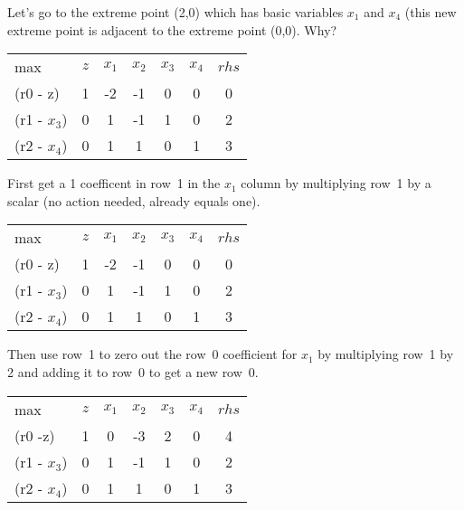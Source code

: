 Let's go to the extreme point (2,0) which has basic variables $x_1$ and $x_4$ (this new extreme point is adjacent to the extreme point (0,0). Why? \\
\begin{center} \begin{tabular} {l|c||c|c|c|c|c|}  \cline{2-7}
max & $z$	& $x_1$ & $x_2$  & $x_3$	& $x_4$	& $rhs$ \\ \cline{2-7}
(r0 - z)	    & 1		& -2        &  -1        &	 0 	    &	  0		&   0    \\ \cline{2-7}
(r1 - $x_3$)			& 0		&	 1        &     -1     &	 1 			&	  0 		&	  2   \\
(r2 - $x_4$)			& 0		&	  1       &	    1    &	 0 		&	  1 		&	   3   \\ \cline{2-7}
\end{tabular} \end{center}

First get a 1 coefficent in row~1 in the  $x_1$ column by multiplying row~1 by a scalar (no action needed, already equals one).\\
 
\begin{center} \begin{tabular} {l|c||c|c|c|c|c|}  \cline{2-7}
max 			& $z$	& $x_1$ & $x_2$  & $x_3$	& $x_4$	& $rhs$ \\ \cline{2-7}
(r0 - z)	    & 1		& -2        &  -1        &	 0 	    &	  0		&   0    \\ \cline{2-7}
(r1 - $x_3$)	& 0		&	 1        &     -1     &	 1 			&	  0 		&	  2   \\
(r2 - $x_4$)	& 0		&	  1       &	    1    &	 0 		&	  1 		&	   3   \\ \cline{2-7}
\end{tabular} \end{center}

Then use row~1 to zero out the row~0 coefficient for $x_1$ by multiplying row~1 by 2 and adding it to row~0 to get a new row~0.\\


\begin{center} \begin{tabular} {l|c||c|c|c|c|c|}  \cline{2-7}
max 			& $z$	& $x_1$ & $x_2$  & $x_3$	& $x_4$	& $rhs$ \\ \cline{2-7}
(r0 -z)	    	& 1		& 0     & -3     &	 2 	&	  0	&   4    \\ \cline{2-7}
(r1 - $x_3$)	& 0		& 1     & -1     &	 1 	&	  0 &	  2   \\
(r2 - $x_4$)	& 0		& 1     &  1    &	 0 	&	  1 &	   3   \\ \cline{2-7}
\end{tabular} \end{center}

